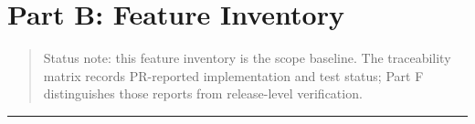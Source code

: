 \documentclass[12pt,a4paper]{article}
\begin{document}
\label{part-a-end}
\clearpage

\section{Part B: Feature Inventory}

\label{part-b-start}


\begin{quote}
Status note: this feature inventory is the scope baseline. The traceability matrix records PR-reported implementation and test status; Part F distinguishes those reports from release-level verification.

\end{quote}

\medskip\noindent\rule{\linewidth}{0.4pt}\medskip

\end{document}
